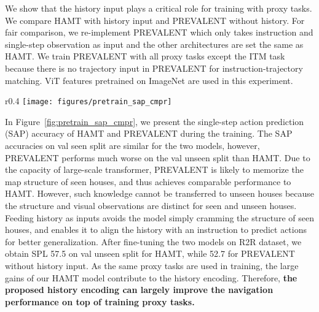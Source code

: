 We show that the history input plays a critical role for training with proxy tasks.
We compare HAMT with history input and PREVALENT \cite{hao2020towards} without history.
For fair comparison, we re-implement PREVALENT which only takes instruction  and single-step observation  as input and the other architectures are set the same as HAMT.
We train PREVALENT with all proxy tasks except the ITM task because there is no trajectory input in PREVALENT for instruction-trajectory matching.
ViT features pretrained on ImageNet are used in this experiment.


\begin{wrapfigure}{r}{0.4\textwidth}
\centering
	\texttt{[image: figures/pretrain\_sap\_cmpr]}
	\caption{SAP accuracy of PREVALENT (w/o history) and HAMT (w/ history) on R2R dataset.}
	\label{fig:pretrain_sap_cmpr}
\end{wrapfigure}
In Figure~\ref{fig:pretrain_sap_cmpr}, we present the single-step action prediction (SAP) accuracy of HAMT and PREVALENT during the training.
The SAP accuracies on val seen split are similar for the two models, however, PREVALENT performs much worse on the val unseen split than HAMT.
Due to the capacity of large-scale transformer, PREVALENT is likely to memorize the map structure of seen houses, and thus achieves comparable performance to HAMT.
However, such knowledge cannot be transferred to unseen houses because the structure and visual observations are distinct for seen and unseen houses.
Feeding history as inputs avoids the model simply cramming the structure of seen houses, and enables it to align the history with an instruction to predict actions for better generalization.
After fine-tuning the two models on R2R dataset, we obtain SPL 57.5 on val unseen split for HAMT, while 52.7 for PREVALENT without history input.
As the same proxy tasks are used in training, the large gains of our HAMT model contribute to the history encoding.
Therefore, \textbf{the proposed history encoding can largely improve the navigation performance on top of training proxy tasks.}

